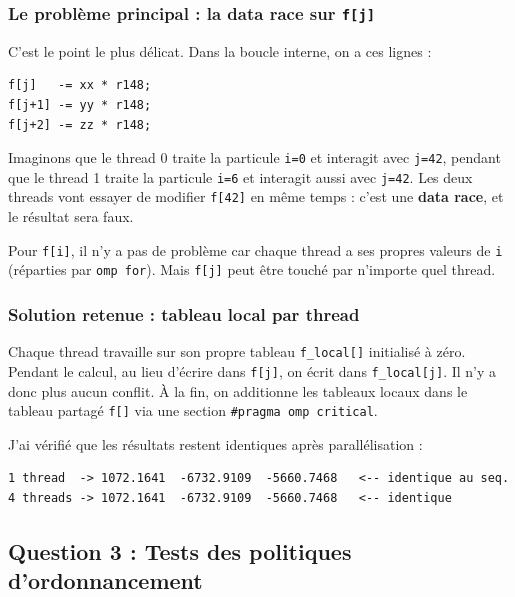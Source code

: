 \documentclass[12pt,a4paper]{article}
\begin{document}
\subsubsection{Le problème principal : la data race sur \texttt{f[j]}}

C'est le point le plus délicat. Dans la boucle interne, on a ces lignes :

\begin{lstlisting}
f[j]   -= xx * r148;
f[j+1] -= yy * r148;
f[j+2] -= zz * r148;
\end{lstlisting}

Imaginons que le thread 0 traite la particule \texttt{i=0} et interagit avec \texttt{j=42}, pendant que le thread 1 traite la particule \texttt{i=6} et interagit aussi avec \texttt{j=42}. Les deux threads vont essayer de modifier \texttt{f[42]} en même temps : c'est une \textbf{\textcolor{warnborder}{data race}}, et le résultat sera faux.

Pour \texttt{f[i]}, il n'y a pas de problème car chaque thread a ses propres valeurs de \texttt{i} (réparties par \texttt{omp for}). Mais \texttt{f[j]} peut être touché par n'importe quel thread.

\subsubsection{Solution retenue : tableau local par thread}

Chaque thread travaille sur son propre tableau \texttt{f\_local[]} initialisé à zéro. Pendant le calcul, au lieu d'écrire dans \texttt{f[j]}, on écrit dans \texttt{f\_local[j]}. Il n'y a donc plus aucun conflit. À la fin, on additionne les tableaux locaux dans le tableau partagé \texttt{f[]} via une section \texttt{\#pragma omp critical}.

J'ai vérifié que les résultats restent identiques après parallélisation :

\begin{resultbox}
\begin{lstlisting}[style=outputstyle, frame=none, backgroundcolor=\color{resultgreen}]
1 thread  -> 1072.1641  -6732.9109  -5660.7468   <-- identique au seq.
4 threads -> 1072.1641  -6732.9109  -5660.7468   <-- identique
\end{lstlisting}
\end{resultbox}


\subsection{Question 3 : Tests des politiques d'ordonnancement}
\end{document}
